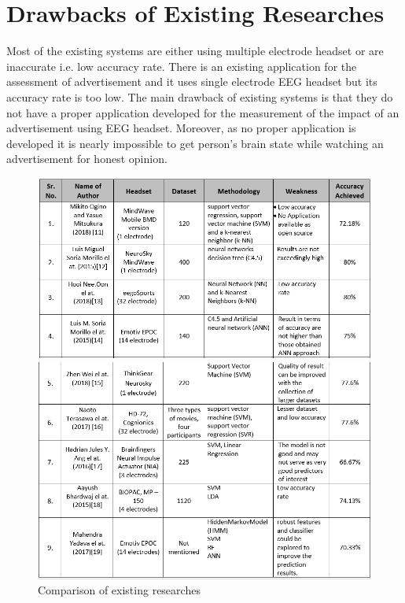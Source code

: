 \documentclass[a4paper, 12pt, oneside]{uet_thesis}
\begin{document}
\section{Drawbacks of Existing Researches}
Most of the existing systems are either using multiple electrode headset or are inaccurate i.e. low accuracy rate. There is an existing application for the assessment of advertisement and it uses single electrode EEG headset but its accuracy rate is too low. The main drawback of existing systems is that they do not have a proper application developed for the measurement of the impact of an advertisement using EEG headset.  Moreover, as no proper application is developed it is nearly impossible to get person’s brain state while watching an advertisement for honest opinion.
\newpage
\begin{figure}[htbp]
\centerline{\includegraphics[scale=0.6]{Untitled.png}}
\centerline{\includegraphics[scale=0.6]{Untitled1.png}}
\caption{Comparison of existing researches}
\label{Table3}
\end{figure}
\end{document}
